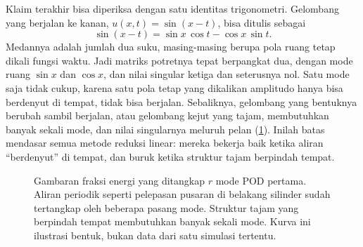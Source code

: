 Klaim terakhir bisa diperiksa dengan satu identitas trigonometri. Gelombang yang berjalan ke kanan,
$u(x,t)=\sin(x-t)$, bisa ditulis sebagai
\begin{equation}
\sin(x-t)=\sin x\,\cos t-\cos x\,\sin t .
\end{equation}
Medannya adalah jumlah dua suku, masing-masing berupa pola ruang tetap dikali fungsi waktu. Jadi matriks potretnya
tepat berpangkat dua, dengan mode ruang $\sin x$ dan $\cos x$, dan nilai singular ketiga dan seterusnya nol. Satu mode
saja tidak cukup, karena satu pola tetap yang dikalikan amplitudo hanya bisa berdenyut di tempat, tidak bisa
berjalan. Sebaliknya, gelombang yang bentuknya berubah sambil berjalan, atau gelombang kejut yang tajam,
membutuhkan banyak sekali mode, dan nilai singularnya meluruh pelan (\cref{fig:svdecay}). Inilah batas mendasar
semua metode reduksi linear: mereka bekerja baik ketika aliran ``berdenyut'' di tempat, dan buruk ketika struktur
tajam berpindah tempat.

\begin{figure}[ht]
\centering
{}
\caption{Gambaran fraksi energi yang ditangkap $r$ mode POD pertama. Aliran periodik seperti pelepasan pusaran di
belakang silinder sudah tertangkap oleh beberapa pasang mode. Struktur tajam yang berpindah tempat membutuhkan
banyak sekali mode. Kurva ini ilustrasi bentuk, bukan data dari satu simulasi tertentu.}
\label{fig:svdecay}
\end{figure}

